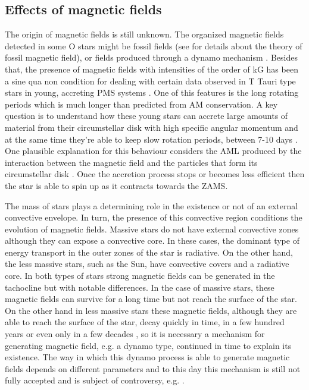 \documentclass[fleqn,usenatbib]{mnras}
\begin{document}
\subsection{Effects of magnetic fields}
The origin of magnetic fields is still unknown. The organized magnetic fields detected in some O stars \citep{Wade2010} might be fossil fields (see \citet{Dudorov2014} for details about the theory of fossil magnetic field), or fields produced through a dynamo mechanism \citep{Cantiello2009}. Besides that, the presence of magnetic fields with intensities of the order of kG \citep{Hussain2014} has been a sine qua non condition for dealing with certain data observed in T Tauri type stars in young, accreting PMS systems \citep{Johns-Krull2007}. One of this features is the long rotating periods  which is much longer than predicted from AM conservation. A key question is to understand how these young stars can accrete large amounts of material from their circumstellar disk with high specific angular momentum and at the same time they're able to keep slow rotation periods, between 7-10 days \citep{Hussain2014}. One plausible explanation for this behaviour considers the AML produced by the interaction between the magnetic field and the particles that form its circumstellar disk \citep{Zanni2012}. Once the accretion process stops or becomes less efficient then the star is able to spin up as it contracts towards the ZAMS.\par

The mass of stars plays a determining role in the existence or not of an external convective envelope. In turn, the presence of this convective region conditions the evolution of magnetic fields. Massive stars do not have external convective zones although they can expose a convective core. In these cases, the dominant type of energy transport in the outer zones of the star is radiative. On the other hand, the less massive stars, such as the Sun, have convective covers and a radiative core. In both types of stars strong magnetic fields can be generated in the tachocline but with notable differences. In the case of massive stars, these magnetic fields can survive for a long time but not reach the surface of the star. On the other hand in less massive stars these magnetic fields, although they are able to reach the surface of the star, decay quickly in time, in a few hundred years or even only in a few decades \citep{Chabrier2006}, so it is necessary a mechanism for generating magnetic field, e.g. a dynamo type, continued in time to explain its existence. The way in which this dynamo process is able to generate magnetic fields depends on different parameters and to this day this mechanism is still not fully accepted and is subject of controversy, e.g. \citep{Charbonneau2010}.\par
\end{document}
